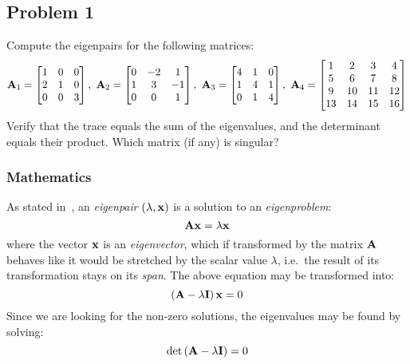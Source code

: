 \subsection{Problem 1}%
\label{sec:problem_1}

Compute the eigenpairs for the following matrices:
\begin{equation*}
    \matr{A}_1 = 
    \begin{bmatrix}
        1 & 0 & 0 \\
        2 & 1 & 0 \\
        0 & 0 & 3 
    \end{bmatrix},\ 
    \matr{A}_2 = 
    \begin{bmatrix}
        0 & -2 &  1 \\
        1 &  3 & -1 \\
        0 & 0 & 1 
    \end{bmatrix},\ 
    \matr{A}_3 = 
    \begin{bmatrix}
        4 & 1 & 0 \\
        1 & 4 & 1 \\
        0 & 1 & 4 
    \end{bmatrix},\ 
    \matr{A}_4 = 
    \begin{bmatrix}
         1 &  2 &  3 &  4 \\
         5 &  6 &  7 &  8 \\
         9 & 10 & 11 & 12 \\
        13 & 14 & 15 & 16
    \end{bmatrix}
\end{equation*}
Verify that the trace equals the sum of the eigenvalues, and the determinant equals
their product. Which matrix (if any) is singular?

\subsubsection*{Mathematics}

As stated in~\cite{Zdunek}, an \textit{eigenpair} $(\lambda, \mathbf{x})$ is a solution to
an \textit{eigenproblem}:
\begin{equation*}
    \mathbf{A}\mathbf{x} = \lambda\mathbf{x}
\end{equation*}
where the vector $\mathbf{x}$ is an \textit{eigenvector}, which if transformed by the matrix
$\mathbf{A}$ behaves like it would be stretched by the scalar value $\lambda$, i.e.~the
result of its transformation stays on its \textit{span}.
The above equation may be transformed into:
\begin{equation*}
    \left(\mathbf{A} - \lambda\mathbf{I}\right)\mathbf{x} = 0
\end{equation*}
Since we are looking for the non-zero solutions, the eigenvalues may be found by solving:
\begin{equation*}
    \det{\left(\mathbf{A} - \lambda\mathbf{I}\right)} = 0
\end{equation*}

